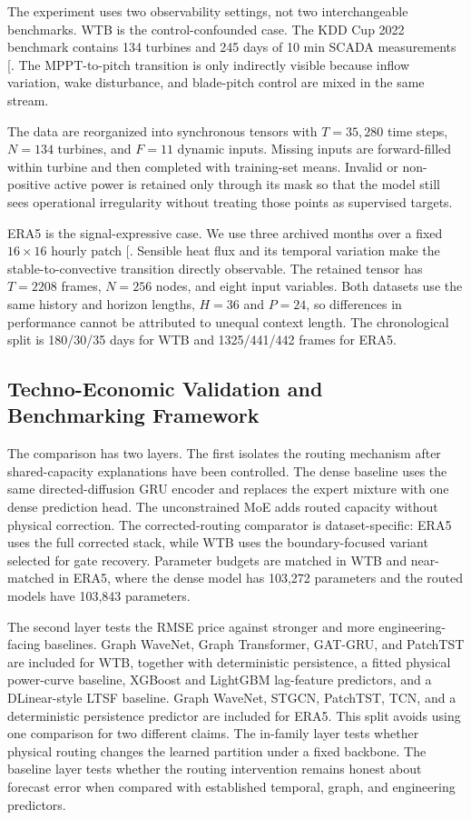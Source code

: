 \documentclass[
  11pt]{article}
\begin{document}
The experiment uses two observability settings, not two interchangeable
benchmarks. WTB is the control-confounded case. The KDD Cup 2022
benchmark contains 134 turbines and 245 days of 10 min SCADA
measurements {[}\citeproc{ref-zhou2024sdwpfdata}{19}{]}. The
MPPT-to-pitch transition is only indirectly visible because inflow
variation, wake disturbance, and blade-pitch control are mixed in the
same stream.

The data are reorganized into synchronous tensors with \(T=35{,}280\)
time steps, \(N=134\) turbines, and \(F=11\) dynamic inputs. Missing
inputs are forward-filled within turbine and then completed with
training-set means. Invalid or non-positive active power is retained
only through its mask so that the model still sees operational
irregularity without treating those points as supervised targets.

ERA5 is the signal-expressive case. We use three archived months over a
fixed \(16 \times 16\) hourly patch
{[}\citeproc{ref-hersbach2020era5}{24}{]}. Sensible heat flux and its
temporal variation make the stable-to-convective transition directly
observable. The retained tensor has \(T=2208\) frames, \(N=256\) nodes,
and eight input variables. Both datasets use the same history and
horizon lengths, \(H=36\) and \(P=24\), so differences in performance
cannot be attributed to unequal context length. The chronological split
is 180/30/35 days for WTB and 1325/441/442 frames for ERA5.

\subsection{Techno-Economic Validation and Benchmarking
Framework}\label{techno-economic-validation-and-benchmarking-framework}

The comparison has two layers. The first isolates the routing mechanism
after shared-capacity explanations have been controlled. The dense
baseline uses the same directed-diffusion GRU encoder and replaces the
expert mixture with one dense prediction head. The unconstrained MoE
adds routed capacity without physical correction. The corrected-routing
comparator is dataset-specific: ERA5 uses the full corrected stack,
while WTB uses the boundary-focused variant selected for gate recovery.
Parameter budgets are matched in WTB and near-matched in ERA5, where the
dense model has 103,272 parameters and the routed models have 103,843
parameters.

The second layer tests the RMSE price against stronger and more
engineering-facing baselines. Graph WaveNet, Graph Transformer, GAT-GRU,
and PatchTST are included for WTB, together with deterministic
persistence, a fitted physical power-curve baseline, XGBoost and
LightGBM lag-feature predictors, and a DLinear-style LTSF baseline.
Graph WaveNet, STGCN, PatchTST, TCN, and a deterministic persistence
predictor are included for ERA5. This split avoids using one comparison
for two different claims. The in-family layer tests whether physical
routing changes the learned partition under a fixed backbone. The
baseline layer tests whether the routing intervention remains honest
about forecast error when compared with established temporal, graph, and
engineering predictors.
\end{document}
